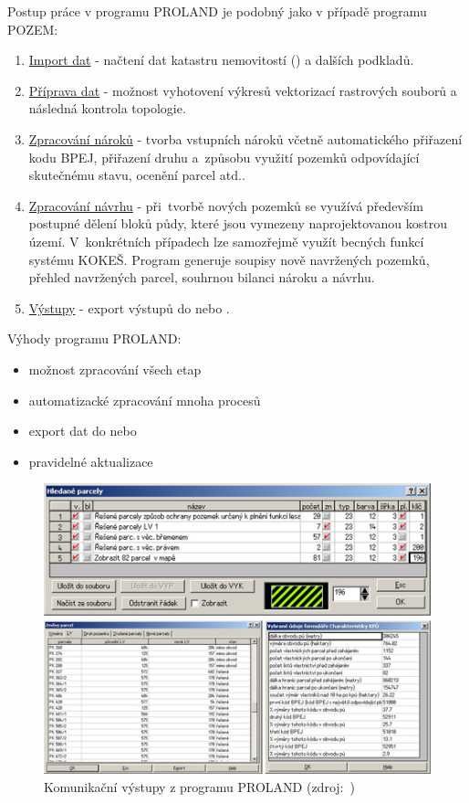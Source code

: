 Postup práce v programu PROLAND je podobný jako v případě programu POZEM:
	\begin{enumerate}[leftmargin=1.5cm]
		\item \underline{Import dat} - načtení dat katastru nemovitostí () a dalších podkladů.
		\item \underline{Příprava dat} - možnost vyhotovení výkresů vektorizací rastrových souborů a následná kontrola topologie.
		\item \underline{Zpracování nároků} - tvorba vstupních nároků včetně automatického přiřazení kodu BPEJ, přiřazení druhu a~způsobu využití pozemků odpovídající skutečnému stavu, ocenění parcel atd..
		\item \underline{Zpracování návrhu} - při~tvorbě nových pozemků se využívá především postupné dělení bloků půdy, které jsou vymezeny naprojektovanou kostrou území. V~konkrétních případech lze samozřejmě využít becných funkcí systému KOKEŠ. Program generuje soupisy nově navržených pozemků, přehled navržených parcel, souhrnou bilanci nároku a návrhu.
		\item \underline{Výstupy} - export výstupů do  nebo .
	\end{enumerate}

Výhody programu PROLAND:
	\begin{itemize}[leftmargin=1.5cm]
		\item možnost zpracování všech etap 
		\item automatizacké zpracování mnoha procesů 
		\item export dat do  nebo~
		\item pravidelné aktualizace
	\end{itemize}

	\begin{figure}[H]
		\centering
		\includegraphics[width=.8\textwidth]{./pictures/proland.png}
		\caption[Komunikační výstupy z programu PROLAND]{Komunikační výstupy z programu PROLAND (zdroj:~\citep{proland_obrazek})}
		\label{fig:proland_obrazek}
 	\end{figure}

